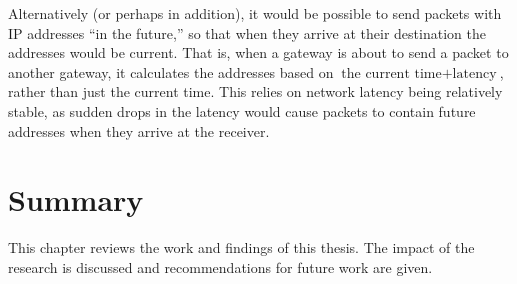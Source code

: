 \par Alternatively (or perhaps in addition), it would be possible to send packets with \ac{IP} addresses ``in the future,'' so that when they arrive at their destination the addresses would be current. That is, when a gateway is about to send a packet to another gateway, it calculates the addresses based on $\text{the current time} + \text{latency}$, rather than just the current time. This relies on network latency being relatively stable, as sudden drops in the latency would cause packets to contain future addresses when they arrive at the receiver. 

\section{Summary}
\par This chapter reviews the work and findings of this thesis. The impact of the research is discussed and recommendations for future work are given.

